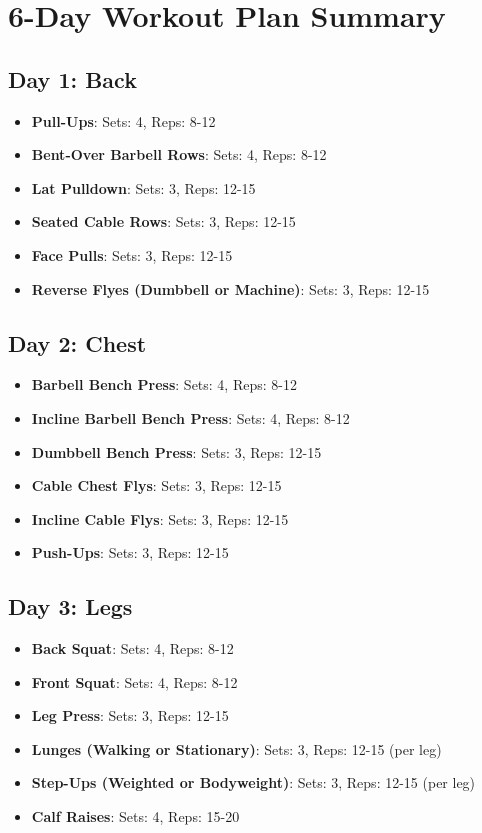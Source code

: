 \documentclass{article}
\begin{document}
\section*{6-Day Workout Plan Summary}

\subsection*{Day 1: Back}
\begin{itemize}
    \item \textbf{Pull-Ups}: Sets: 4, Reps: 8-12
    \item \textbf{Bent-Over Barbell Rows}: Sets: 4, Reps: 8-12
    \item \textbf{Lat Pulldown}: Sets: 3, Reps: 12-15
    \item \textbf{Seated Cable Rows}: Sets: 3, Reps: 12-15
    \item \textbf{Face Pulls}: Sets: 3, Reps: 12-15
    \item \textbf{Reverse Flyes (Dumbbell or Machine)}: Sets: 3, Reps: 12-15
\end{itemize}

\subsection*{Day 2: Chest}
\begin{itemize}
    \item \textbf{Barbell Bench Press}: Sets: 4, Reps: 8-12
    \item \textbf{Incline Barbell Bench Press}: Sets: 4, Reps: 8-12
    \item \textbf{Dumbbell Bench Press}: Sets: 3, Reps: 12-15
    \item \textbf{Cable Chest Flys}: Sets: 3, Reps: 12-15
    \item \textbf{Incline Cable Flys}: Sets: 3, Reps: 12-15
    \item \textbf{Push-Ups}: Sets: 3, Reps: 12-15
\end{itemize}

\subsection*{Day 3: Legs}
\begin{itemize}
    \item \textbf{Back Squat}: Sets: 4, Reps: 8-12
    \item \textbf{Front Squat}: Sets: 4, Reps: 8-12
    \item \textbf{Leg Press}: Sets: 3, Reps: 12-15
    \item \textbf{Lunges (Walking or Stationary)}: Sets: 3, Reps: 12-15 (per leg)
    \item \textbf{Step-Ups (Weighted or Bodyweight)}: Sets: 3, Reps: 12-15 (per leg)
    \item \textbf{Calf Raises}: Sets: 4, Reps: 15-20
\end{itemize}
\end{document}
